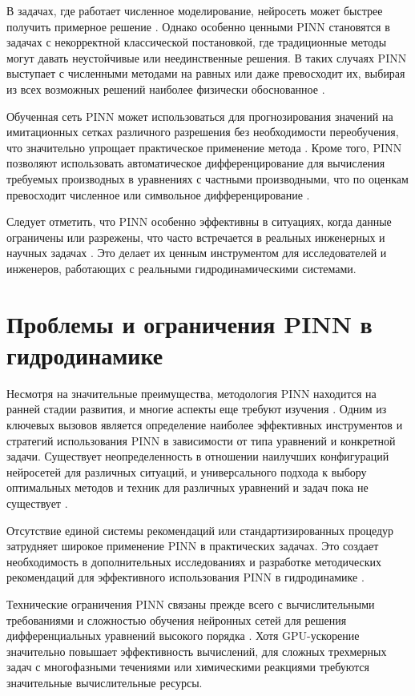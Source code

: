 В задачах, где работает численное моделирование, нейросеть может быстрее получить примерное
решение \cite{kochkov2021machine}. Однако особенно ценными PINN становятся в задачах с некорректной классической постановкой,
где традиционные методы могут давать неустойчивые или неединственные решения. В таких случаях PINN выступает с численными
методами на равных или даже превосходит их, выбирая из всех возможных решений наиболее физически обоснованное
\cite{yang2019adversarial}.

Обученная сеть PINN может использоваться для прогнозирования значений на имитационных сетках различного разрешения без
необходимости переобучения, что значительно упрощает практическое применение метода \cite{raissi2019physics}. Кроме того,
PINN позволяют использовать автоматическое дифференцирование для вычисления требуемых производных в уравнениях с частными
производными, что по оценкам превосходит численное или символьное дифференцирование \cite{baydin2018automatic}.

Следует отметить, что PINN особенно эффективны в ситуациях, когда данные ограничены или разрежены, что часто встречается
в реальных инженерных и научных задачах \cite{zhu2019physics}. Это делает их ценным инструментом для исследователей и
инженеров, работающих с реальными гидродинамическими системами.

\section{Проблемы и ограничения PINN в гидродинамике}
Несмотря на значительные преимущества, методология PINN находится на ранней стадии развития, и многие аспекты еще требуют
изучения \cite{cuomo2022scientific}. Одним из ключевых вызовов является определение наиболее эффективных инструментов
и стратегий использования PINN в зависимости от типа уравнений и конкретной задачи. Существует неопределенность в отношении
наилучших конфигураций нейросетей для различных ситуаций, и универсального подхода к выбору оптимальных методов и техник
для различных уравнений и задач пока не существует \cite{krishnapriyan2021characterizing}.

Отсутствие единой системы рекомендаций или стандартизированных процедур затрудняет широкое применение PINN в практических
задачах. Это создает необходимость в дополнительных исследованиях и разработке методических рекомендаций для эффективного
использования PINN в гидродинамике \cite{wang2022respecting}.

Технические ограничения PINN связаны прежде всего с вычислительными требованиями и сложностью обучения нейронных сетей для
решения дифференциальных уравнений высокого порядка \cite{wang2021understanding}. Хотя GPU-ускорение значительно повышает
эффективность вычислений, для сложных трехмерных задач с многофазными течениями или химическими реакциями требуются
значительные вычислительные ресурсы.

